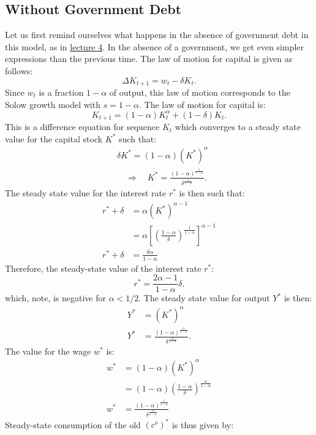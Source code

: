 \documentclass[]{book}
\theoremstyle{definition}
\theoremstyle{definition}
\theoremstyle{definition}
\theoremstyle{remark}
\begin{document}
\subsection{Without Government Debt}\label{without-government-debt}

Let us first remind ourselves what happens in the absence of government
debt in this model, as in \href{lecture4.html}{lecture 4}. In the
absence of a government, we get even simpler expressions than the
previous time. The law of motion for capital is given as follows:
\[\Delta K_{t+1}=w_{t}-\delta K_{t}.\] Since \(w_t\) is a fraction
\(1-\alpha\) of output, this law of motion corresponds to the Solow
growth model with \(s = 1-\alpha\). The law of motion for capital is:
\[K_{t+1}=(1-\alpha) K_{t}^{\alpha}+ (1-\delta)K_t.\] This is a
difference equation for sequence \(K_{t}\) which converges to a steady
state value for the capital stock \(K^{*}\) such that: \[
\begin{aligned}
& \delta K^{*} = (1-\alpha)(K^*)^{\alpha}\\
& \quad \Rightarrow \quad K^{*}=\frac{(1-\alpha)^{\frac{1}{1-\alpha}}}{\delta^{\frac{1}{1-\alpha}}}.
\end{aligned}
\] The steady state value for the interest rate \(r^{*}\) is then such
that: \[
\begin{aligned}
r^{*}+\delta&=\alpha(K^{*})^{\alpha-1}\\
&= \alpha \left[\left(\frac{1-\alpha}{\delta}\right)^{\frac{1}{1-\alpha}}\right]^{\alpha-1}\\
r^{*}+\delta &=\frac{\delta \alpha}{1-\alpha}
\end{aligned}
\] Therefore, the steady-state value of the interest rate \(r^{*}\):
\[r^{*} = \frac{2\alpha-1}{1-\alpha}\delta.\] which, note, is negative
for \(\alpha < 1/2\). The steady state value for output \(Y^{*}\) is
then: \[
\begin{aligned}
Y^{*}&=\left(K^{*}\right)^{\alpha}\\
Y^{*}&=\frac{(1-\alpha)^{\frac{\alpha}{1-\alpha}}}{\delta^{\frac{\alpha}{1-\alpha}}}.
\end{aligned}
\] The value for the wage \(w^{*}\) is: \[
\begin{aligned}
w^{*}&=(1-\alpha)\left(K^{*}\right)^{\alpha}\\
&=(1-\alpha) \left(\frac{1-\alpha}{\delta}\right)^{\frac{\alpha}{1-\alpha}}\\
w^{*} &= \frac{\left(1-\alpha\right)^{\frac{1}{1-\alpha}}}{\delta^{\frac{\alpha}{1-\alpha}}}
\end{aligned}
\] Steady-state consumption of the old \((c^{o})^{*}\) is thus given by:
\end{document}
